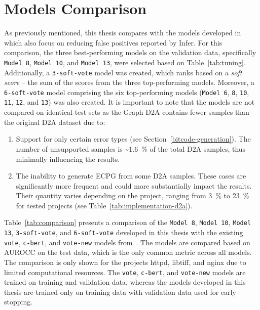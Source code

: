 \section{Models Comparison}
\label{model-comparison}
As previously mentioned, this thesis compares with the models developed in~\cite{D2A-zheng2021d2a, pujar2024analyzing} which also focus on reducing false positives reported by Infer. For this comparison, the three best-performing models on the validation data, specifically \texttt{Model 8}, \texttt{Model 10}, and \texttt{Model 13}, were selected based on Table~\ref{tab:tuning}. Additionally, a \texttt{3-soft-vote} model was created, which ranks based on a \textit{soft score} -- the sum of the scores from the three top-performing models. Moreover, a \texttt{6-soft-vote} model comprising the six top-performing models (\texttt{Model 6}, \texttt{8}, \texttt{10}, \texttt{11}, \texttt{12}, and \texttt{13}) was also created. It is important to note that the models are not compared on identical test sets as the Graph D2A contains fewer samples than the original D2A dataset due to:
\begin{enumerate}
    \item Support for only certain error types (see Section~\ref{bitcode-generation}). The number of unsupported samples is \textasciitilde1.6~\% of the total D2A samples, thus minimally influencing the results.
    \item The inability to generate ECPG from some D2A samples. These cases are significantly more frequent and could more substantially impact the results. Their quantity varies depending on the project, ranging from 3~\% to 23~\% for tested projects (see Table~\ref{tab:implementation-d2a}).
\end{enumerate}

Table~\ref{tab:comparison} presents a comparison of the \texttt{Model 8}, \texttt{Model 10}, \texttt{Model 13}, \texttt{3-soft-vote}, and \texttt{6-soft-vote} developed in this thesis with the existing \texttt{vote}, \texttt{c-bert}, and \texttt{vote-new} models from~\cite{D2A-zheng2021d2a, pujar2024analyzing}. The models are compared based on AUROCC on the test data, which is the only common metric across all models. The comparison is only shown for the projects httpd, libtiff, and nginx due to limited computational resources. The \texttt{vote}, \texttt{c-bert}, and \texttt{vote-new} models are trained on training and validation data, whereas the models developed in this thesis are trained only on training data with validation data used for early stopping.

